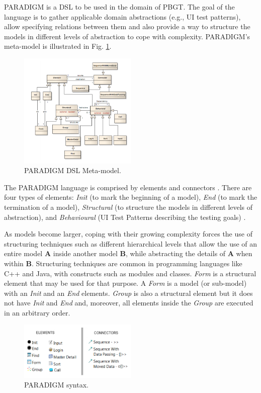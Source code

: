 \documentclass[10pt, conference, compsocconf]{IEEEtran}
\begin{document}
PARADIGM is a DSL to be used in the domain of PBGT. The goal of the language is to gather applicable domain abstractions (e.g., UI test patterns), allow specifying relations between them and also provide a way to structure the models in different levels of abstraction to cope with complexity. PARADIGM's meta-model is illustrated in Fig. \ref{fig:dsl}.

\begin{figure}[!htb]
\centering
\includegraphics[width=0.5\textwidth]{dsl}
\caption{PARADIGM DSL Meta-model.}
\label{fig:dsl}
\end{figure}

The PARADIGM language is comprised by elements and connectors \cite{moreira2013pattern}. There are four types of elements: \textit{Init} (to mark the beginning of a model), \textit{End} (to mark the termination of a model), \textit{Structural} (to structure the models in different levels of abstraction), and \textit{Behavioural} (UI Test Patterns describing the testing goals) \cite{RMoreiraPatterns}.

As models become larger, coping with their growing complexity forces the use of structuring techniques such as different hierarchical levels that allow the use of an entire model \textbf{A} inside another model \textbf{B}, while abstracting the details of \textbf{A} when within \textbf{B}. Structuring techniques are common in programming languages like C++ and Java, with constructs such as modules and classes. \textit{Form} is a structural element that may be used for that purpose. A \textit{Form} is a model (or sub-model) with an \textit{Init} and an \textit{End} elements. \textit{Group} is also a structural element but it does not have \textit{Init} and \textit{End} and, moreover, all elements inside the \textit{Group} are executed in an arbitrary order.

\begin{figure}[!htb] 
\centering
\includegraphics[width=0.5\textwidth]{sintaxe}
\caption{PARADIGM syntax.}
\label{fig:dsl1}
\end{figure}
\end{document}
